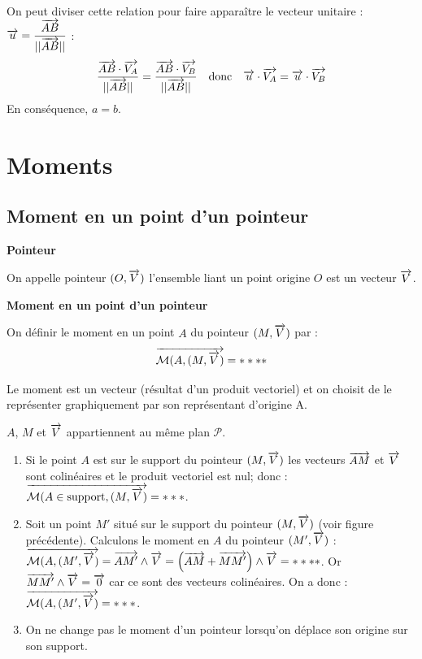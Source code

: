 \documentclass[10pt,oneside]{article}
\begin{document}
\begin{rem}
\begin{minipage}[c]{.47\linewidth}
On peut diviser cette relation pour faire apparaître le vecteur unitaire : $\overrightarrow{u}=\dfrac{\overrightarrow{AB}}{||\overrightarrow{AB}||}$ : 
$$
\dfrac{\overrightarrow{AB}\cdot \overrightarrow{V_A} }{||\overrightarrow{AB}||} 
=\dfrac{\overrightarrow{AB}\cdot \overrightarrow{V_B} }{||\overrightarrow{AB}||} 
\quad \text{donc} \quad
\overrightarrow{u}\cdot \overrightarrow{V_A} = \overrightarrow{u}\cdot \overrightarrow{V_B} 
$$ 
 En conséquence, $a=b$.

\end{minipage}\hfill
\begin{minipage}[c]{.47\linewidth}
\end{minipage}
\end{rem}

\section{Moments}

\subsection{Moment en un point d'un pointeur}

\begin{defi}
\textbf{Pointeur}

On appelle pointeur $(O,\overrightarrow{V})$ l'ensemble liant un point origine $O$ est un vecteur $\overrightarrow{V}$. 
\end{defi}

\begin{defi}
\textbf{Moment en un point d'un pointeur}

On définir le moment en un point $A$ du pointeur $(M,\overrightarrow{V})$ par : 
$$
\overrightarrow{\mathcal{M}(A,(M,\overrightarrow{V})} = ****
$$

Le moment est un vecteur (résultat d'un produit vectoriel) et on choisit de le représenter graphiquement par son représentant d'origine A. 

$A$, $M$ et $\overrightarrow{V}$ appartiennent au même plan $\mathcal{P}$. 
\end{defi}

\begin{props}
\begin{enumerate}
\item Si le point $A$ est sur le support du pointeur $(M,\overrightarrow{V})$ les vecteurs $\overrightarrow{AM}$ et $\overrightarrow{V}$ sont colinéaires et le produit vectoriel est nul; donc : 
$\overrightarrow{\mathcal{M}(A\in\text{support},(M,\overrightarrow{V})} =*** $.
\item Soit un point $M'$ situé sur le support du pointeur $(M,\overrightarrow{V})$ (voir figure précédente). Calculons le moment en $A$ du pointeur $(M',\overrightarrow{V})$ :
$\overrightarrow{\mathcal{M}(A,(M',\overrightarrow{V})} = \overrightarrow{AM'} \wedge \overrightarrow{V} = \left(\overrightarrow{AM}+\overrightarrow{MM'} \right)\wedge \overrightarrow{V} = ****$. Or $\overrightarrow{MM'}\wedge\overrightarrow{V}=\overrightarrow{0}$ car ce sont des vecteurs colinéaires. On a donc :
$\overrightarrow{\mathcal{M}(A,(M',\overrightarrow{V})} = ***$.
\item On ne change pas le moment d'un pointeur lorsqu'on déplace son origine sur son support. 
\end{enumerate}
\end{props}
\end{document}

